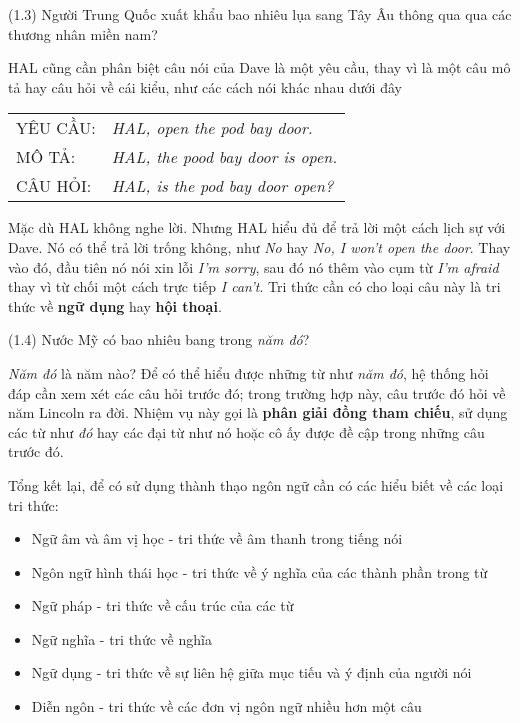 \vspace{2mm}
\noindent
(1.3) Người Trung Quốc xuất khẩu bao nhiêu lụa sang Tây Âu thông qua qua các thương nhân miền nam?
\vspace{2mm}

HAL cũng cần phân biệt câu nói của Dave là một yêu cầu, thay vì là một câu mô tả hay câu hỏi về cái kiểu, như các cách nói khác nhau dưới đây

\begin{tabular}{ l l }
	 YÊU CẦU: & \textit{HAL, open the pod bay door.} \\
	 MÔ TẢ: & \textit{HAL, the pood bay door is open.} \\
	 CÂU HỎI: & \textit{HAL, is the pod bay door open?}
	\end{tabular}
 \label{table:1}

Mặc dù HAL không nghe lời. Nhưng HAL hiểu đủ để trả lời một cách lịch sự với Dave. Nó có thể trả lời trống không, như \textit{No} hay \textit{No, I won't open the door}. Thay vào đó, đầu tiên nó nói xin lỗi \textit{I'm sorry}, sau đó nó thêm vào cụm từ \textit{I'm afraid} thay vì từ chối một cách trực tiếp \textit{I can't}. Tri thức cần có cho loại câu này là tri thức về \textbf{ngữ dụng} hay \textbf{hội thoại}.

\vspace{2mm}
\noindent
(1.4) Nước Mỹ có bao nhiêu bang trong \textit{năm đó}?
\vspace{2mm}

\textit{Năm đó} là năm nào? Để có thể hiểu được những từ như \textit{năm đó}, hệ thống hỏi đáp cần xem xét các câu hỏi trước đó; trong trường hợp này, câu trước đó hỏi về năm Lincoln ra đời. Nhiệm vụ này gọi là \textbf{phân giải đồng tham chiếu}, sử dụng các từ như \textit{đó} hay các đại từ như nó hoặc cô ấy được đề cập trong những câu trước đó.

Tổng kết lại, để có sử dụng thành thạo ngôn ngữ cần có các hiểu biết về các loại tri thức:

\begin{itemize}[noitemsep]
  \item Ngữ âm và âm vị học - tri thức về âm thanh trong tiếng nói
  \item Ngôn ngữ hình thái học - tri thức về ý nghĩa của các thành phần trong từ
  \item Ngữ pháp - tri thức về cấu trúc của các từ
  \item Ngữ nghĩa - tri thức về nghĩa
  \item Ngữ dụng - tri thức về sự liên hệ giữa mục tiếu và ý định của người nói
  \item Diễn ngôn - tri thức về các đơn vị ngôn ngữ nhiều hơn một câu
\end{itemize}

